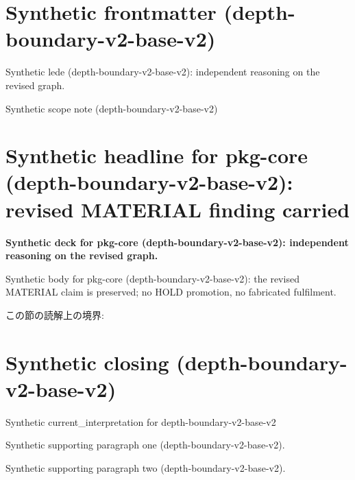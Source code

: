 \documentclass[lualatex,a4paper,10pt]{jlreq}
\begin{document}
\surveycover
\clearpage
\section*{Synthetic frontmatter (depth-boundary-v2-base-v2)}
Synthetic lede (depth-boundary-v2-base-v2): independent reasoning on the revised graph.

\begin{claimboundary}
\noindent Synthetic scope note (depth-boundary-v2-base-v2)\par
\end{claimboundary}
\clearpage
\twocolumn
\section{Synthetic headline for pkg-core (depth-boundary-v2-base-v2): revised MATERIAL finding carried}
\label{pkg:pkg-core}
\noindent\textbf{Synthetic deck for pkg-core (depth-boundary-v2-base-v2): independent reasoning on the revised graph.} \cite{w2026-W33target-source}\par\medskip
\noindent Synthetic body for pkg-core (depth-boundary-v2-base-v2): the revised MATERIAL claim is preserved; no HOLD promotion, no fabricated fulfilment.\par\medskip
\begin{claimboundary}
この節の読解上の境界: 
\end{claimboundary}
\clearpage
\onecolumn
\section{Synthetic closing (depth-boundary-v2-base-v2)}
\label{sec:issue-summary}
\noindent Synthetic current\_interpretation for depth-boundary-v2-base-v2\par\medskip
\noindent Synthetic supporting paragraph one (depth-boundary-v2-base-v2).\par\medskip
\noindent Synthetic supporting paragraph two (depth-boundary-v2-base-v2).\par\medskip
\clearpage
\onecolumn
\printbibliography[title={References / Source Notes}]
\end{document}
